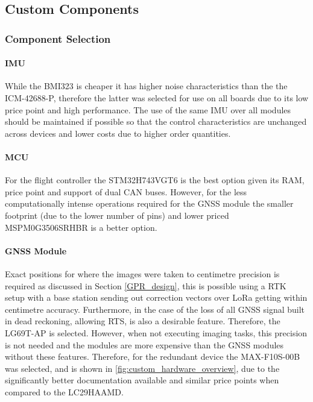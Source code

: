 \subsection{Custom Components}\label{sub_sub_section:tgt_custom_components}

\subsubsection{Component Selection}\label{sub_sub_section:tgt_component_selection}

\paragraph{\gls{IMU}}
While the BMI323 is cheaper it has higher noise characteristics than the the ICM-42688-P, therefore the latter was selected for use on all boards due to its low price point and high performance. The use of the same \gls{IMU} over all modules should be maintained if possible so that the control characteristics are unchanged across devices and lower costs due to higher order quantities.
\paragraph{\gls{MCU}}
For the flight controller the STM32H743VGT6 is the best option given its \gls{RAM}, price point and support of dual \gls{CAN} buses. However, for the less computationally intense operations required for the \gls{GNSS} module the smaller footprint (due to the lower number of pins) and lower priced MSPM0G3506SRHBR is a better option.
\paragraph{\gls{GNSS} Module}
Exact positions for where the images were taken to centimetre precision is required as discussed in Section \ref{GPR_design}, this is possible using a \gls{RTK} setup with a base station sending out correction vectors over LoRa getting within centimetre accuracy\cite{RTK_LORA}. Furthermore, in the case of the loss of all \gls{GNSS} signal built in dead reckoning, allowing \gls{RTS}, is also a desirable feature. Therefore, the LG69T-AP is selected. However, when not executing imaging tasks, this precision is not needed and the modules are more expensive than the \gls{GNSS} modules without these features. Therefore, for the redundant device the MAX-F10S-00B was selected, and is shown in \ref{fig:custom_hardware_overview}, due to the significantly better documentation available and similar price points when compared to the LC29HAAMD.

